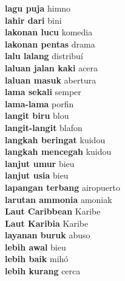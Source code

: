 \textbf{ lagu puja  } himno \\
\textbf{ lahir dari  } bini \\
\textbf{ lakonan lucu  } komedia \\
\textbf{ lakonan pentas  } drama \\
\textbf{ lalu lalang  } distribuí \\
\textbf{ laluan jalan kaki  } acera \\
\textbf{ laluan masuk  } abertura \\
\textbf{ lama sekali  } semper \\
\textbf{ lama-lama  } porfin \\
\textbf{ langit biru  } blou \\
\textbf{ langit-langit  } blafon \\
\textbf{ langkah beringat  } kuidou \\
\textbf{ langkah mencegah  } kuidou \\
\textbf{ lanjut umur  } bieu \\
\textbf{ lanjut usia  } bieu \\
\textbf{ lapangan terbang  } airopuerto \\
\textbf{ larutan ammonia  } amoniak \\
\textbf{ Laut Caribbean  } Karibe \\
\textbf{ Laut Karibia  } Karibe \\
\textbf{ layanan buruk  } abuso \\
\textbf{ lebih awal  } bieu \\
\textbf{ lebih baik  } mihó \\
\textbf{ lebih kurang  } cerca \\
